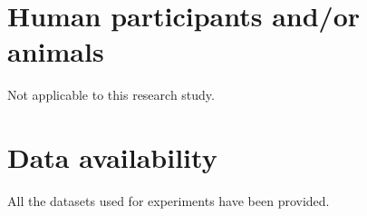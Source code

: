 \documentclass[sn-mathphys,Numbered]{sn-jnl}%
\begin{document}
\section*{Human participants and/or animals}
Not applicable to this research study.

\section*{Data availability}
All the datasets used for experiments have been provided. 









\end{document}
